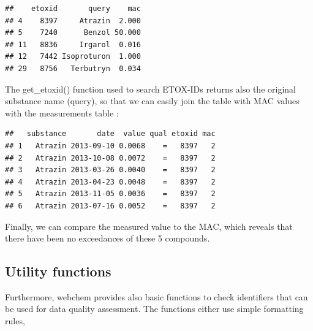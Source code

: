 \begin{knitrout}
\color{fgcolor}\begin{kframe}
\begin{alltt}
 \hlkwb{<-} \hlstd{(ids, ids[}\hlopt{!} \hlopt{&} 
                              \hlstd{(}\hlstd{,} \hlstd{,} \hlstd{)]))}
\end{alltt}
\begin{verbatim}
##    etoxid       query    mac
## 4    8397     Atrazin  2.000
## 5    7240      Benzol 50.000
## 11   8836     Irgarol  0.016
## 12   7442 Isoproturon  1.000
## 29   8756   Terbutryn  0.034
\end{verbatim}
\end{kframe}
\end{knitrout}

The get\_etoxid() function used to search ETOX-IDs returns also the original substance name (query),
so that we can easily join the table with MAC values with the measurements table :
\begin{knitrout}
\color{fgcolor}\begin{kframe}
\begin{alltt}
 \hlkwb{<-}   \hlstd{=} \hlstd{,}  \hlstd{=} \hlstd{)}
\end{alltt}
\begin{verbatim}
##   substance       date  value qual etoxid mac
## 1   Atrazin 2013-09-10 0.0068    =   8397   2
## 2   Atrazin 2013-10-08 0.0072    =   8397   2
## 3   Atrazin 2013-03-26 0.0040    =   8397   2
## 4   Atrazin 2013-04-23 0.0048    =   8397   2
## 5   Atrazin 2013-11-05 0.0036    =   8397   2
## 6   Atrazin 2013-07-16 0.0052    =   8397   2
\end{verbatim}
\end{kframe}
\end{knitrout}

Finally, we can compare the measured value to the MAC, which reveals that there have been no exceedances of these 5 compounds.




\subsection[Utility functions]{Utility functions}
Furthermore, webchem provides also basic functions to check identifiers that can be used for data quality assessment.
The functions either use simple formatting rules,

